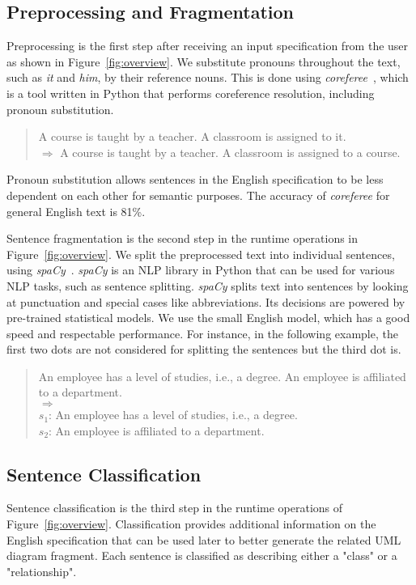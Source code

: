 \documentclass[sigconf]{acmart}
\begin{document}
\subsection{Preprocessing and Fragmentation}
Preprocessing is the first step after receiving an input specification from the user as shown in Figure~\ref{fig:overview}. We substitute pronouns throughout the text, such as \textit{it} and \textit{him}, by their reference nouns. This is done using \textit{coreferee}~\cite{coreferee}, which is a tool written in Python that performs coreference resolution, including pronoun substitution.

\begin{quote}
    A course is taught by a teacher. A classroom is assigned to it.\\
    $\Longrightarrow$
    A course is taught by a teacher. A classroom is assigned to a course.
\end{quote}



Pronoun substitution allows sentences in the English specification to be less dependent on each other for semantic purposes. The accuracy of \textit{coreferee} for general English text is 81\%.

Sentence fragmentation is the second step in the runtime operations in Figure~\ref{fig:overview}. We split the preprocessed text into individual sentences, using \textit{spaCy}~\cite{spacy}. \textit{spaCy} is an NLP library in Python that can be used for various NLP tasks, such as sentence splitting. \textit{spaCy} splits text into sentences by looking at punctuation and special cases like abbreviations. Its decisions are powered by pre-trained statistical models. We use the small English model, which has a good speed and respectable performance. For instance, in the following example, the first two dots are not considered for splitting the sentences but the third dot is.



\begin{quote}
    An employee has a level of studies, i.e., a degree. An employee is affiliated to a department.\\
    $\Longrightarrow$\\
    $s_1$: An employee has a level of studies, i.e., a degree.\\
    $s_2$: An employee is affiliated to a department.
\end{quote}

\subsection{Sentence Classification} \label{sec:classification}
Sentence classification is the third step in the runtime operations of Figure~\ref{fig:overview}. Classification provides additional information on the English specification that can be used later to better generate the related UML diagram fragment. Each sentence is classified as describing either a "class" or a "relationship".
\end{document}
